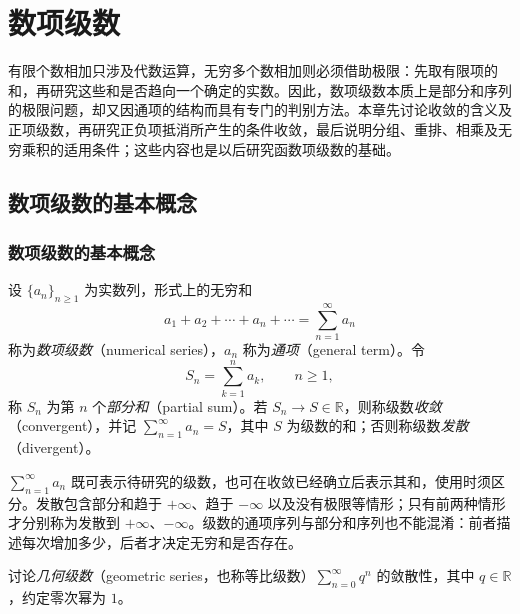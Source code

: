 \setcounter{chapter}{8} %
\chapter{数项级数}
\label{chap:numerical-series}

有限个数相加只涉及代数运算，无穷多个数相加则必须借助极限：先取有限项的和，再研究这些和是否趋向一个确定的实数。因此，数项级数本质上是部分和序列的极限问题，却又因通项的结构而具有专门的判别方法。本章先讨论收敛的含义及正项级数，再研究正负项抵消所产生的条件收敛，最后说明分组、重排、相乘及无穷乘积的适用条件；这些内容也是以后研究函数项级数的基础。

\section{数项级数的基本概念}
\label{sec:basic-concepts-of-numerical-series}

\subsection{数项级数的基本概念}
\label{subsec:basic-concepts-of-numerical-series}

\begin{definition}
设 $\{a_n\}_{n\geq1}$ 为实数列，形式上的无穷和
\[
    a_1+a_2+\cdots+a_n+\cdots=\sum_{n=1}^{\infty}a_n
\]
称为\emph{数项级数}（numerical series），$a_n$ 称为\emph{通项}（general term）。令
\begin{equation}
    S_n=\sum_{k=1}^n a_k,\qquad n\geq1,
    \label{eq:numerical-series-partial-sums}
\end{equation}
称 $S_n$ 为第 $n$ 个\emph{部分和}（partial sum）。若 $S_n\to S\in\mathbb R$，则称级数\emph{收敛}（convergent），并记 $\sum_{n=1}^{\infty}a_n=S$，其中 $S$ 为级数的和；否则称级数\emph{发散}（divergent）。
\end{definition}

$\sum_{n=1}^{\infty}a_n$ 既可表示待研究的级数，也可在收敛已经确立后表示其和，使用时须区分。发散包含部分和趋于 $+\infty$、趋于 $-\infty$ 以及没有极限等情形；只有前两种情形才分别称为发散到 $+\infty$、$-\infty$。级数的通项序列与部分和序列也不能混淆：前者描述每次增加多少，后者才决定无穷和是否存在。

\begin{example}
\label{ex:geometric-numerical-series}
讨论\emph{几何级数}（geometric series，也称等比级数）$\sum_{n=0}^{\infty}q^n$ 的敛散性，其中 $q\in\mathbb R$，约定零次幂为 $1$。
\end{example}

